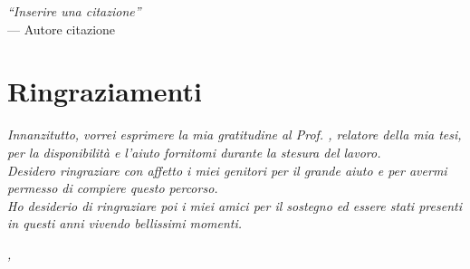 \cleardoublepage
{}
{}


\begin{flushright}{
    \slshape
    ``Inserire una citazione''} \\
    \medskip
    --- Autore citazione
\end{flushright}


\bigskip

\begingroup
\let\clearpage\relax
\let\cleardoublepage\relax
\let\cleardoublepage\relax

\chapter*{Ringraziamenti}

\noindent \textit{Innanzitutto, vorrei esprimere la mia gratitudine al Prof. \myProf, relatore della mia tesi, per la disponibilità e l'aiuto fornitomi durante la stesura del lavoro.}\\

\noindent \textit{Desidero ringraziare con affetto i miei genitori per il grande aiuto e per avermi permesso di compiere questo percorso.}\\

\noindent \textit{Ho desiderio di ringraziare poi i miei amici per il sostegno ed essere stati presenti in questi anni vivendo bellissimi momenti.}\\
\bigskip

\noindent\textit{\myLocation, \myTime}
\hfill \myName

\endgroup
